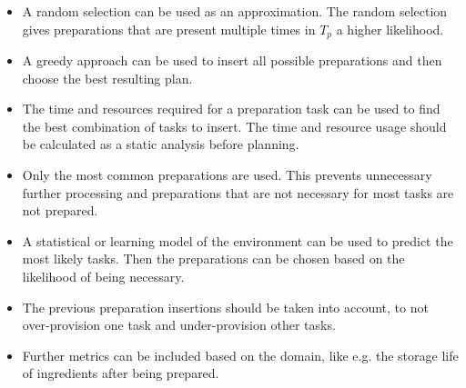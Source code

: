 \begin{itemize}
  \item A random selection can be used as an approximation.
    The random selection gives preparations that are present multiple times in $T_p$ a higher likelihood.
  \item A greedy approach can be used to insert all possible preparations and then choose the best resulting plan.
  \item The time and resources required for a preparation task can be used to find the best combination of tasks to insert.
  The time and resource usage should be calculated as a static analysis before planning.
  \item Only the most common preparations are used.
    This prevents unnecessary further processing and preparations that are not necessary for most tasks are not prepared.
  \item A statistical or learning model of the environment can be used to predict the most likely tasks.
    Then the preparations can be chosen based on the likelihood of being necessary.
  \item The previous preparation insertions should be taken into account, to not over-provision one task and under-provision other tasks.
  \item Further metrics can be included based on the domain, like e.g. the storage life of ingredients after being prepared.
\end{itemize}
